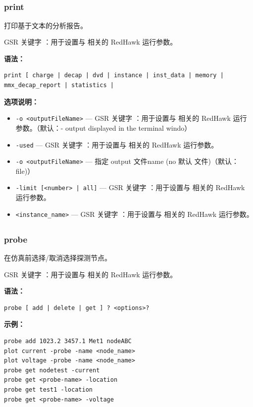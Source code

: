 \subsection{}
\subsubsection*{print}

打印基于文本的分析报告。

GSR 关键字 ：用于设置与  相关的 RedHawk 运行参数。

\textbf{语法：}
\begin{lstlisting}
print [ charge | decap | dvd | instance | inst_data | memory | mmx_decap_report | statistics |
\end{lstlisting}

\textbf{选项说明：}
\begin{itemize}
\item \texttt{-o <outputFileName>} — GSR 关键字 ：用于设置与  相关的 RedHawk 运行参数。（默认：- output displayed in the terminal windo）
\item \texttt{-used} — GSR 关键字 ：用于设置与  相关的 RedHawk 运行参数。
\item \texttt{-o <outputFileName>} — 指定 output 文件name (no 默认 文件)（默认：file)）
\item \texttt{-limit [<number> | all]} — GSR 关键字 ：用于设置与  相关的 RedHawk 运行参数。
\item \texttt{<instance\_name>} — GSR 关键字 ：用于设置与  相关的 RedHawk 运行参数。
\end{itemize}

\subsection{}
\subsubsection*{probe}

在仿真前选择/取消选择探测节点。

GSR 关键字 ：用于设置与  相关的 RedHawk 运行参数。

\textbf{语法：}
\begin{lstlisting}
probe [ add | delete | get ] ? <options>?
\end{lstlisting}

\textbf{示例：}
\begin{lstlisting}
probe add 1023.2 3457.1 Met1 nodeABC
plot current -probe -name <node_name>
plot voltage -probe -name <node_name>
probe get nodetest -current
probe get <probe-name> -location
probe get test1 -location
probe get <probe-name> -voltage
\end{lstlisting}

